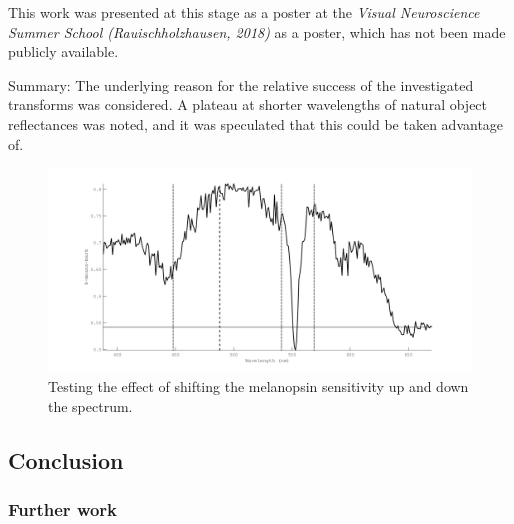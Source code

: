 This work was presented at this stage as a poster at the \emph{Visual Neuroscience Summer School (Rauischholzhausen, 2018)} as a poster, which has not been made publicly available.

Summary: The underlying reason for the relative success of the investigated transforms was considered. A plateau at shorter wavelengths of natural object reflectances was noted, and it was speculated that this could be taken advantage of.

\begin{figure}[htbp]
 \includegraphics[max width=\textwidth]{figs/comp/melcomp_9/5a_diffMel.png}
 \caption{Testing the effect of shifting the melanopsin sensitivity up and down the spectrum.}
 \label{fig:9opt}
\end{figure} 


\subsection{Conclusion}

\subsubsection{Further work}

